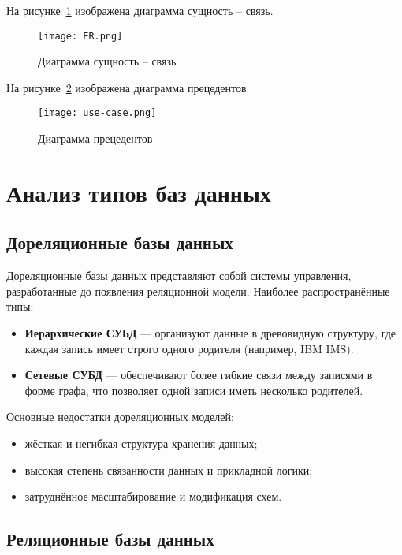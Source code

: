 На рисунке~\ref{fig:er} изображена диаграмма сущность -- связь.

\begin{figure}[H]
	\centering
	\texttt{[image: ER.png]}
	\caption{Диаграмма сущность -- связь}
	\label{fig:er}
\end{figure}

\clearpage

На рисунке~\ref{fig:use-case} изображена диаграмма прецедентов.

\begin{figure}[H]
	\centering
	\texttt{[image: use-case.png]}
	\caption{Диаграмма прецедентов}
	\label{fig:use-case}
\end{figure}

\section{Анализ типов баз данных}

\subsection{Дореляционные базы данных}

Дореляционные базы данных представляют собой системы управления, разработанные до появления реляционной модели. Наиболее распространённые типы:

\begin{itemize}
    \item \textbf{Иерархические СУБД} — организуют данные в древовидную структуру, где каждая запись имеет строго одного родителя (например, IBM IMS).
    \item \textbf{Сетевые СУБД} — обеспечивают более гибкие связи между записями в форме графа, что позволяет одной записи иметь несколько родителей.
\end{itemize}

Основные недостатки дореляционных моделей:
\begin{itemize}
    \item жёсткая и негибкая структура хранения данных;
    \item высокая степень связанности данных и прикладной логики;
    \item затруднённое масштабирование и модификация схем.
\end{itemize}

\subsection{Реляционные базы данных}

